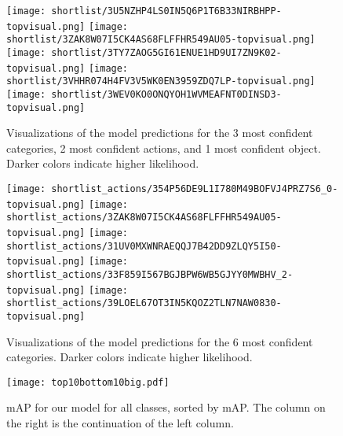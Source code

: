 \documentclass[10pt,twocolumn,letterpaper]{article}
\begin{document}
\clearpage

\begin{figure}[p]
\centering
\texttt{[image: shortlist/3U5NZHP4LS0IN5Q6P1T6B33NIRBHPP-topvisual.png]}
\texttt{[image: shortlist/3ZAK8W07I5CK4AS68FLFFHR549AU05-topvisual.png]}
\texttt{[image: shortlist/3TY7ZAOG5GI61ENUE1HD9UI7ZN9K02-topvisual.png]}
\texttt{[image: shortlist/3VHHR074H4FV3V5WK0EN3959ZDQ7LP-topvisual.png]}
\texttt{[image: shortlist/3WEV0KO0ONQYOH1WVMEAFNT0DINSD3-topvisual.png]}
\caption{Visualizations of the model predictions for the 3 most confident categories, 2 most confident actions, and 1 most confident object. Darker colors indicate higher likelihood.}
\label{fig:shortlist}
\end{figure}

\begin{figure}[p]
\centering
\texttt{[image: shortlist\_actions/354P56DE9L1I780M49BOFVJ4PRZ7S6\_0-topvisual.png]}
\texttt{[image: shortlist\_actions/3ZAK8W07I5CK4AS68FLFFHR549AU05-topvisual.png]}
\texttt{[image: shortlist\_actions/31UV0MXWNRAEQQJ7B42DD9ZLQY5I50-topvisual.png]}
\texttt{[image: shortlist\_actions/33F859I567BGJBPW6WB5GJYY0MWBHV\_2-topvisual.png]}
\texttt{[image: shortlist\_actions/39LOEL67OT3IN5KQOZ2TLN7NAW0830-topvisual.png]}
\caption{Visualizations of the model predictions for the 6 most confident categories. Darker colors indicate higher likelihood.}
\label{fig:shortlist_actions}
\end{figure}

\begin{figure}[p]
\centering
\texttt{[image: top10bottom10big.pdf]}
\caption{mAP for our model for all classes, sorted by mAP. The column on the right is the continuation of the left column.}
\label{fig:mAP}
\end{figure}
\end{document}
